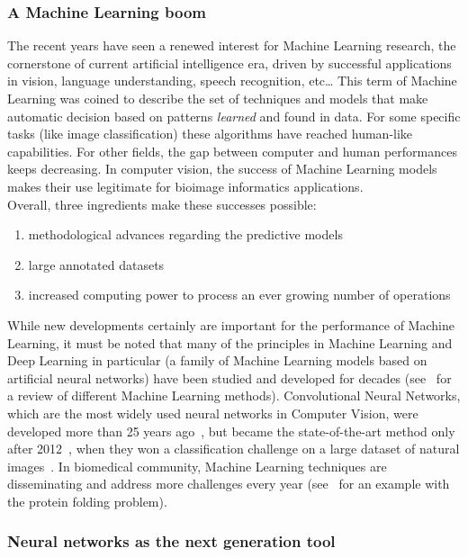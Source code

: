\subsubsection{A Machine Learning boom}

The recent years have seen a renewed interest for Machine Learning research, the cornerstone of current artificial intelligence era, driven by successful applications in vision, language understanding, speech recognition, etc\dots
This term of Machine Learning was coined to describe the set of techniques and models that make automatic decision based on patterns \emph{learned} and found in data.
For some specific tasks (like image classification) these algorithms have reached human-like capabilities.
For other fields, the gap between computer and human performances keeps decreasing.
In computer vision, the success of Machine Learning models makes their use legitimate for bioimage informatics applications.\\

\noindent
Overall, three ingredients make these successes possible:
\begin{enumerate}
	\setlength\itemsep{0.1em}
	\item methodological advances regarding the predictive models
	\item large annotated datasets
	\item increased computing power to process an ever growing number of operations
\end{enumerate}

\noindent
While new developments certainly are important for the performance of Machine Learning, it must be noted that many of the principles in Machine Learning and Deep Learning in particular (a family of Machine Learning models based on artificial neural networks) have been studied and developed for decades (see~\cite{Bishop_2006, hastie_elements_2009} for a review of different Machine Learning methods).
Convolutional Neural Networks, which are the most widely used neural networks in Computer Vision, were developed more than 25 years ago~\cite{LeCun1998}, but became the state-of-the-art method only after 2012~\cite{alexnet_2012}, when they won a classification challenge on a large dataset of natural images~\cite{Deng_2009}.
In biomedical community, Machine Learning techniques are disseminating and address more challenges every year (see~\cite{jumper_highly_2021} for an example with the protein folding problem).

\subsubsection{Neural networks as the next generation tool}

